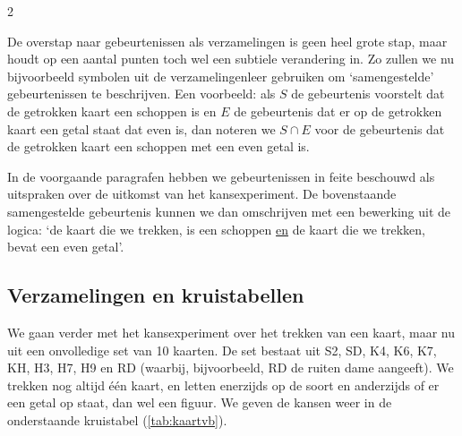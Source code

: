 \begin{multicols}{2}
\begin{afbeeldingenv}
\caption{Gebeurtenis als deelverzameling van het universum}
\label{fig:kaarten_gebeurtenis}
\end{afbeeldingenv}

De overstap naar gebeurtenissen als verzamelingen is geen heel grote stap, maar houdt op een aantal punten toch wel een subtiele verandering in. Zo zullen we nu bijvoorbeeld symbolen uit de verzamelingenleer gebruiken om ‘samengestelde’ gebeurtenissen te beschrijven. Een voorbeeld: als $S$ de gebeurtenis voorstelt dat de getrokken kaart een schoppen is en $E$ de gebeurtenis dat er op de getrokken kaart een getal staat dat even is, dan noteren we $S \cap E$ voor de gebeurtenis dat de getrokken kaart een schoppen met een even getal is.

In de voorgaande paragrafen hebben we gebeurtenissen in feite beschouwd als uitspraken over de uitkomst van het kansexperiment. De bovenstaande samengestelde gebeurtenis kunnen we dan omschrijven met een bewerking uit de logica: ‘de kaart die we trekken, is een schoppen \underline{en} de kaart die we trekken, bevat een even getal’.

\subsection*{Verzamelingen en kruistabellen}

We gaan verder met het kansexperiment over het trekken van een kaart, maar nu uit een onvolledige set van 10 kaarten. De set bestaat uit S2, SD, K4, K6, K7, KH, H3, H7, H9 en RD (waarbij, bijvoorbeeld, RD de ruiten dame aangeeft). We trekken nog altijd één kaart, en letten enerzijds op de soort en anderzijds of er een getal op staat, dan wel een figuur. We geven de kansen weer in de onderstaande kruistabel (\autoref{tab:kaartvb}).


\end{multicols}
